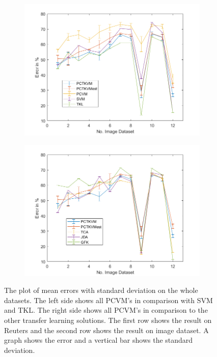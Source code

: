 \begin{figure}[!]
\begin{subfigure}{.5\textwidth}
		\includegraphics[width=1\linewidth]{figures/AverageImage.png}
		\caption{\label{FigErrorAvImTL}}
	\end{subfigure}%
	\begin{subfigure}{.5\textwidth}
		\centering
		\includegraphics[width=1\linewidth]{figures/AverageImageTL.png}
		\caption{\label{FigErrorAvImO}}
	\end{subfigure}
	\caption[Plot of mean Error and standard Deviation on the whole Datasets]{The plot of mean errors with standard deviation on the whole datasets. The left side shows all \acs{PCVM}'s in comparison with \acs{SVM} and \acs{TKL}. The right side shows all \acs{PCVM}'s in comparison to the other transfer learning solutions. The first row shows the result on Reuters and the second row shows the result on image dataset. A graph shows the error and a vertical bar shows the standard deviation. \label{FigErrorAv}}
\end{figure}


